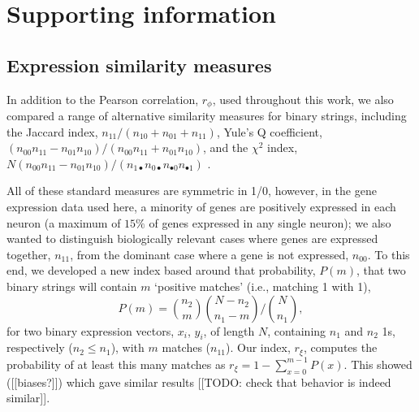 \documentclass[10pt,letterpaper]{article}
\begin{document}

\newpage
\section*{Supporting information}

\subsection*{Expression similarity measures}

In addition to the Pearson correlation, $r_\phi$, used throughout this work, we also compared a range of alternative similarity measures for binary strings, including the
Jaccard index, $n_{11}/(n_{10}+n_{01}+n_{11})$,
Yule's Q coefficient, $(n_{00}n_{11} - n_{01}n_{10})/(n_{00}n_{11} + n_{01}n_{10})$,
and the $\chi^2$ index, $N (n_{00}n_{11} - n_{01}n_{10})/(n_{1\bullet}n_{0\bullet}n_{\bullet 0}n_{\bullet 1})$ \cite{Kaufman2006}.

All of these standard measures are symmetric in 1/0, however, in the gene expression data used here, a minority of genes are positively expressed in each neuron (a maximum of $15\%$ of genes expressed in any single neuron); we also wanted to distinguish biologically relevant cases where genes are expressed together, $n_{11}$, from the dominant case where a gene is not expressed, $n_{00}$.
To this end, we developed a new index based around that probability, $P(m)$, that two binary strings will contain $m$ `positive matches' (i.e., matching 1 with 1),
\begin{equation}
    P(m) = \binom{n_2}{m} \binom{N-n_2}{n_1-m} / \binom{N}{n_1},
\end{equation}
for two binary expression vectors, $x_i$, $y_i$, of length $N$, containing $n_1$ and $n_2$ 1s, respectively ($n_2 \leq n_1$), with $m$ matches ($n_{11}$).
Our index, $r_\xi$, computes the probability of at least this many matches as $r_\xi = 1 - \sum_{x=0}^{m-1} P(x)$.
This showed ([[biases?]]) which gave similar results [[TODO: check that behavior is indeed similar]].
\end{document}
